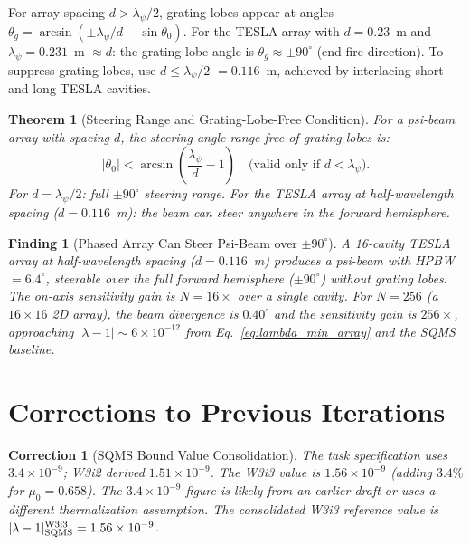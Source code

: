 \documentclass[11pt,twocolumn]{article}
\newcommand{\lam}{\lambda}
\newcommand{\ee}[1]{\times 10^{#1}}
\newtheorem{theorem}{Theorem}[section]
\newtheorem{finding}{Finding}[section]
\newtheorem{correction}{Correction}[section]
\begin{document}
For array spacing $d > \lambda_\psi/2$, grating lobes appear at
angles $\theta_g = \arcsin(\pm\lambda_\psi/d - \sin\theta_0)$.
For the TESLA array with $d = 0.23$~m and $\lambda_\psi = 0.231$~m
$\approx d$: the grating lobe angle is $\theta_g \approx \pm 90^\circ$
(end-fire direction). To suppress grating lobes, use $d \leq \lambda_\psi/2$
$= 0.116$~m, achieved by interlacing short and long TESLA cavities.

\begin{theorem}[Steering Range and Grating-Lobe-Free Condition]
\label{thm:steering_range}
For a psi-beam array with spacing $d$, the steering angle range free
of grating lobes is:
\begin{equation}
\boxed{
|\theta_0| < \arcsin\!\left(\frac{\lambda_\psi}{d} - 1\right)
\quad\text{(valid only if }d < \lambda_\psi\text{)}.
}
\label{eq:grating_free}
\end{equation}
For $d = \lambda_\psi/2$: full $\pm 90^\circ$ steering range.
For the TESLA array at half-wavelength spacing ($d = 0.116$~m):
the beam can steer anywhere in the forward hemisphere.
\end{theorem}

\begin{finding}[Phased Array Can Steer Psi-Beam over $\pm 90^\circ$]
\label{find:phased_array}
A 16-cavity TESLA array at half-wavelength spacing ($d = 0.116$~m)
produces a psi-beam with HPBW $= 6.4^\circ$, steerable over the full
forward hemisphere ($\pm 90^\circ$) without grating lobes. The on-axis
sensitivity gain is $N = 16\times$ over a single cavity. For $N = 256$
(a $16\times16$ 2D array), the beam divergence is $0.40^\circ$ and
the sensitivity gain is $256\times$, approaching $|\lam-1| \sim 6\ee{-12}$
from Eq.~\eqref{eq:lambda_min_array} and the SQMS baseline.
\end{finding}


\section{Corrections to Previous Iterations}
\label{sec:corrections}

\begin{correction}[SQMS Bound Value Consolidation]
\label{cor:sqms_value}
The task specification uses $3.4\ee{-9}$; W3i2 derived $1.51\ee{-9}$.
The W3i3 value is $1.56\ee{-9}$ (adding $3.4\%$ for $\mu_0 = 0.658$).
The $3.4\ee{-9}$ figure is likely from an earlier draft or uses a
different thermalization assumption. The consolidated W3i3 reference
value is $|\lam-1|_{\rm SQMS}^{\rm W3i3} = 1.56\ee{-9}$.
\end{correction}
\end{document}
